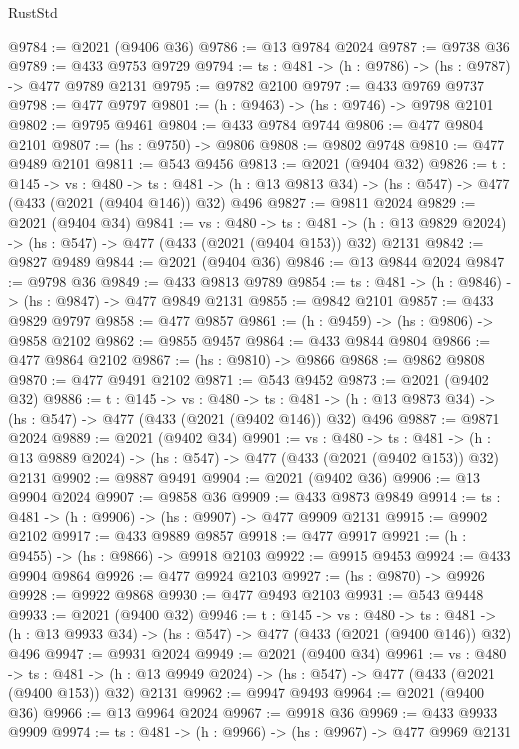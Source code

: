 \begin{lexlean}{RustStd}
\begin{coremodule}
{\begin{coremodule}
{{{{{{{{{{{{{{{{@9784 := @2021 (@9406 @36)
@9786 := @13 @9784 @2024
@9787 := @9738 @36
@9789 := @433 @9753 @9729
@9794 := {ts : @481} -> (h : @9786) -> (hs : @9787) -> @477 @9789 @2131
@9795 := @9782 @2100
@9797 := @433 @9769 @9737
@9798 := @477 @9797
@9801 := (h : @9463) -> (hs : @9746) -> @9798 @2101
@9802 := @9795 @9461
@9804 := @433 @9784 @9744
@9806 := @477 @9804 @2101
@9807 := (hs : @9750) -> @9806
@9808 := @9802 @9748
@9810 := @477 @9489 @2101
@9811 := @543 @9456
@9813 := @2021 (@9404 @32)
@9826 := {t : @145} ->
  {vs : @480} ->
  {ts : @481} -> (h : @13 @9813 @34) -> (hs : @547) -> @477 (@433 (@2021 (@9404 @146)) @32) @496
@9827 := @9811 @2024
@9829 := @2021 (@9404 @34)
@9841 := {vs : @480} ->
  {ts : @481} -> (h : @13 @9829 @2024) -> (hs : @547) -> @477 (@433 (@2021 (@9404 @153)) @32) @2131
@9842 := @9827 @9489
@9844 := @2021 (@9404 @36)
@9846 := @13 @9844 @2024
@9847 := @9798 @36
@9849 := @433 @9813 @9789
@9854 := {ts : @481} -> (h : @9846) -> (hs : @9847) -> @477 @9849 @2131
@9855 := @9842 @2101
@9857 := @433 @9829 @9797
@9858 := @477 @9857
@9861 := (h : @9459) -> (hs : @9806) -> @9858 @2102
@9862 := @9855 @9457
@9864 := @433 @9844 @9804
@9866 := @477 @9864 @2102
@9867 := (hs : @9810) -> @9866
@9868 := @9862 @9808
@9870 := @477 @9491 @2102
@9871 := @543 @9452
@9873 := @2021 (@9402 @32)
@9886 := {t : @145} ->
  {vs : @480} ->
  {ts : @481} -> (h : @13 @9873 @34) -> (hs : @547) -> @477 (@433 (@2021 (@9402 @146)) @32) @496
@9887 := @9871 @2024
@9889 := @2021 (@9402 @34)
@9901 := {vs : @480} ->
  {ts : @481} -> (h : @13 @9889 @2024) -> (hs : @547) -> @477 (@433 (@2021 (@9402 @153)) @32) @2131
@9902 := @9887 @9491
@9904 := @2021 (@9402 @36)
@9906 := @13 @9904 @2024
@9907 := @9858 @36
@9909 := @433 @9873 @9849
@9914 := {ts : @481} -> (h : @9906) -> (hs : @9907) -> @477 @9909 @2131
@9915 := @9902 @2102
@9917 := @433 @9889 @9857
@9918 := @477 @9917
@9921 := (h : @9455) -> (hs : @9866) -> @9918 @2103
@9922 := @9915 @9453
@9924 := @433 @9904 @9864
@9926 := @477 @9924 @2103
@9927 := (hs : @9870) -> @9926
@9928 := @9922 @9868
@9930 := @477 @9493 @2103
@9931 := @543 @9448
@9933 := @2021 (@9400 @32)
@9946 := {t : @145} ->
  {vs : @480} ->
  {ts : @481} -> (h : @13 @9933 @34) -> (hs : @547) -> @477 (@433 (@2021 (@9400 @146)) @32) @496
@9947 := @9931 @2024
@9949 := @2021 (@9400 @34)
@9961 := {vs : @480} ->
  {ts : @481} -> (h : @13 @9949 @2024) -> (hs : @547) -> @477 (@433 (@2021 (@9400 @153)) @32) @2131
@9962 := @9947 @9493
@9964 := @2021 (@9400 @36)
@9966 := @13 @9964 @2024
@9967 := @9918 @36
@9969 := @433 @9933 @9909
@9974 := {ts : @481} -> (h : @9966) -> (hs : @9967) -> @477 @9969 @2131
}}}}}}}}}}}}}}}}
\end{coremodule}}
\end{coremodule}
\end{lexlean}
